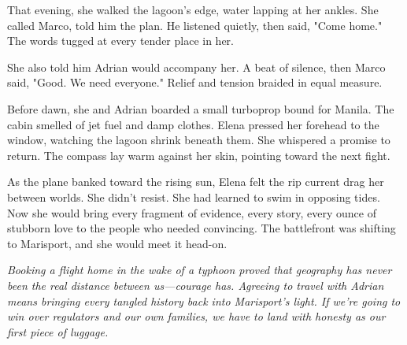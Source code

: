 That evening, she walked the lagoon's edge, water lapping at her ankles. She called Marco, told him the plan. He listened quietly, then said, "Come home." The words tugged at every tender place in her.

She also told him Adrian would accompany her. A beat of silence, then Marco said, "Good. We need everyone." Relief and tension braided in equal measure.

Before dawn, she and Adrian boarded a small turboprop bound for Manila. The cabin smelled of jet fuel and damp clothes. Elena pressed her forehead to the window, watching the lagoon shrink beneath them. She whispered a promise to return. The compass lay warm against her skin, pointing toward the next fight.

As the plane banked toward the rising sun, Elena felt the rip current drag her between worlds. She didn't resist. She had learned to swim in opposing tides. Now she would bring every fragment of evidence, every story, every ounce of stubborn love to the people who needed convincing. The battlefront was shifting to Marisport, and she would meet it head-on.


\noindent\textit{Booking a flight home in the wake of a typhoon proved that geography has never been the real distance between us—courage has. Agreeing to travel with Adrian means bringing every tangled history back into Marisport's light. If we're going to win over regulators and our own families, we have to land with honesty as our first piece of luggage.}
